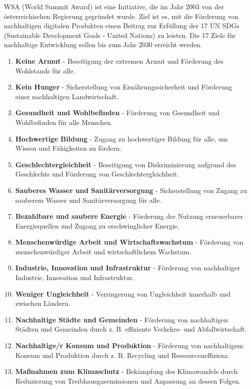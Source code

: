 WSA (World Summit Award) ist eine Initiative, die im Jahr 2003 von der österreichischen Regierung gegründet wurde. Ziel ist es, mit die Förderung von nachhaltigen digitalen Produkten einen Beitrag zur Erfüllung der 17 UN SDGs (Sustainable Development Goals - United Nations) zu leisten. Die 17 Ziele für nachhaltige Entwicklung sollen bis zum Jahr 2030 erreicht werden. 
         
\begin{enumerate}
\item \textbf{Keine Armut} - Beseitigung der extremen Armut und Förderung des Wohlstands für alle.
\item \textbf{Kein Hunger} - Sicherstellung von Ernährungssicherheit und Förderung einer nachhaltigen Landwirtschaft.
\item \textbf{Gesundheit und Wohlbefinden} - Förderung von Gesundheit und Wohlbefinden für alle Menschen.
\item \textbf{Hochwertige Bildung} - Zugang zu hochwertiger Bildung für alle, um Wissen und Fähigkeiten zu fördern.
\item \textbf{Geschlechtergleichheit} - Beseitigung von Diskriminierung aufgrund des Geschlechts und Förderung von Geschlechtergleichheit.
\item \textbf{Sauberes Wasser und Sanitärversorgung} - Sicherstellung von Zugang zu sauberem Wasser und Sanitärversorgung für alle.
\item \textbf{Bezahlbare und saubere Energie} - Förderung der Nutzung erneuerbarer Energiequellen und Zugang zu erschwinglicher Energie.
\item \textbf{Menschenwürdige Arbeit und Wirtschaftswachstum} - Förderung von menschenwürdiger Arbeit und wirtschaftlichem Wachstum.
\item \textbf{Industrie, Innovation und Infrastruktur} - Förderung von nachhaltiger Industrie, Innovation und Infrastruktur.
\item \textbf{Weniger Ungleichheit} - Verringerung von Ungleichheit innerhalb und zwischen Ländern.
\item \textbf{Nachhaltige Städte und Gemeinden} - Förderung von nachhaltigen Städten und Gemeinden durch z. B. effiziente Verkehrs- und Abfallwirtschaft.
\item \textbf{Nachhaltige/r Konsum und Produktion} - Förderung von nachhaltigem Konsum und Produktion durch z. B. Recycling und Ressourceneffizienz.
\item \textbf{Maßnahmen zum Klimaschutz} - Bekämpfung des Klimawandels durch Reduzierung von Treibhausgasemissionen und Anpassung an dessen Folgen.

\end{enumerate}

